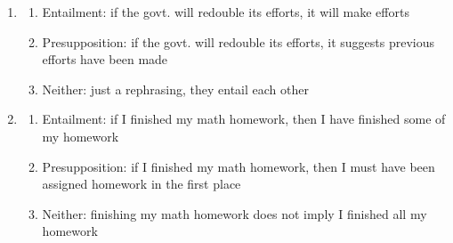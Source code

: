 \documentclass[12pt, a4paper]{article}
\begin{document}
\begin{enumerate}
\begin{enumerate}
      \item Turkey: bird name derived from the country ("turkey-cock") so they are polysemes\\ 
        finger: usage as blaming derived from the usage of touching, so they are polysemes
    \end{enumerate}

  \item 
    \begin{enumerate}
      \item Entailment: if the govt. will redouble its efforts, it will make efforts 
      \item Presupposition: if the govt. will redouble its efforts, it suggests previous efforts have been made
      \item Neither: just a rephrasing, they entail each other
    \end{enumerate}

  \item 
    \begin{enumerate}
      \item Entailment: if I finished my math homework, then I have finished some of my homework 
      \item Presupposition: if I finished my math homework, then I must have been assigned homework in the first place 
      \item Neither: finishing my math homework does not imply I finished all my homework
    \end{enumerate}
\end{enumerate}
\end{document}
